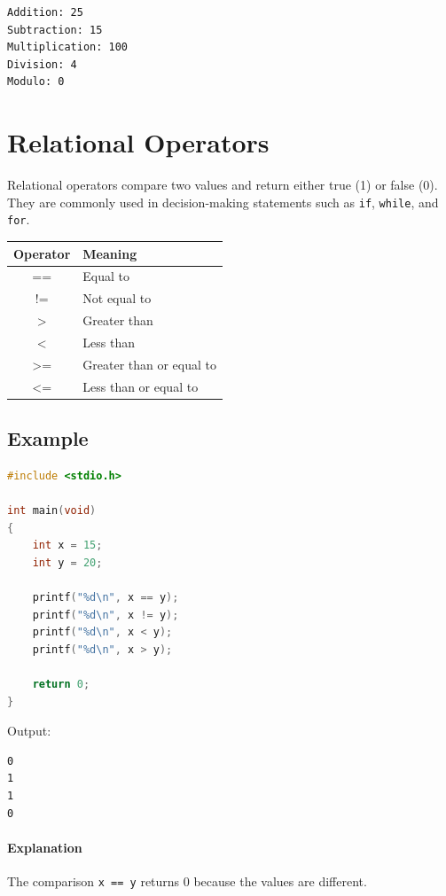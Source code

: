 \documentclass[12pt,openany]{book}
\begin{document}
\begin{lstlisting}
Addition: 25
Subtraction: 15
Multiplication: 100
Division: 4
Modulo: 0
\end{lstlisting}
\section{Relational Operators}

Relational operators compare two values and return either true (1) or false (0). They are commonly used in decision-making statements such as \texttt{if}, \texttt{while}, and \texttt{for}.

\begin{center}
\begin{tabular}{|c|l|}
\hline
\textbf{Operator} & \textbf{Meaning} \\
\hline
== & Equal to \\
!= & Not equal to \\
> & Greater than \\
< & Less than \\
>= & Greater than or equal to \\
<= & Less than or equal to \\
\hline
\end{tabular}
\end{center}

\subsection{Example}

\begin{lstlisting}[language=C]
#include <stdio.h>

int main(void)
{
    int x = 15;
    int y = 20;

    printf("%d\n", x == y);
    printf("%d\n", x != y);
    printf("%d\n", x < y);
    printf("%d\n", x > y);

    return 0;
}
\end{lstlisting}

Output:

\begin{lstlisting}
0
1
1
0
\end{lstlisting}

\paragraph{Explanation}

The comparison \texttt{x == y} returns 0 because the values are different.
\end{document}
